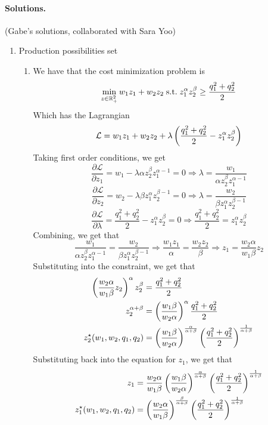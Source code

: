 \documentclass[12pt]{article}
\begin{document}
\paragraph{Solutions.} (Gabe's solutions, collaborated with Sara Yoo)

\begin{enumerate}
	\item Production possibilities set
	\begin{enumerate}
		\item We have that the cost minimization problem is
		\[
		\min_{z\in \mathbb{R}^2_+} w_1z_1 + w_2z_2 \;\text{s.t.}\; z_1^\alpha z_2^\beta \ge \frac{q_1^2 + q_2^2}{2}
		\]
		Which has the Lagrangian
		\[
		\mathcal{L} = w_1 z_1 + w_2 z_2 + \lambda \left(  \frac{q_1^2 + q_2^2}{2} -  z_1^\alpha z_2^\beta\right)
		\]
		Taking first order conditions, we get
		\[
		\frac{\partial \mathcal{L}}{\partial z_1} = w_1 - \lambda \alpha z_2^\beta z_1^{\alpha - 1} = 0 \Longrightarrow \lambda = \frac{w_1}{\alpha z_2^\beta z_1^{\alpha - 1}} 
		\]
		\[
		\frac{\partial \mathcal{L}}{\partial z_2} = w_2 - \lambda \beta z_1^\alpha z_2^{\beta - 1} = 0 \Longrightarrow \lambda = \frac{w_2}{\beta z_1^\alpha z_2^{\beta - 1}}
		\]
		\[
		\frac{\partial \mathcal{L}}{\partial \lambda} = \frac{q_1^2 + q_2^2}{2} -  z_1^\alpha z_2^\beta = 0 \Longrightarrow \frac{q_1^2 + q_2^2}{2} =  z_1^\alpha z_2^\beta
		\]
		Combining, we get that
		\[
		\frac{w_1}{\alpha z_2^\beta z_1^{\alpha - 1}} = \frac{w_2}{\beta z_1^\alpha z_2^{\beta - 1}} \Longrightarrow \frac{w_1 z_1}{\alpha} = \frac{w_2 z_2}{\beta} \Longrightarrow z_1 = \frac{w_2\alpha}{w_1\beta} z_2
		\]
		Substituting into the constraint, we get that
		\begin{align*}
			\left( \frac{w_2\alpha}{w_1\beta} z_2 \right)^\alpha z_2^\beta &= \frac{q_1^2 + q_2^2}{2} \\
			z_2^{\alpha + \beta} &= \left( \frac{w_1\beta}{w_2\alpha}\right)^{\alpha} \frac{q_1^2 + q_2^2}{2} \\
			z_2^\star(w_1,w_2,q_1,q_2) &= \left( \frac{w_1\beta}{w_2\alpha}\right)^{\frac{\alpha}{\alpha + \beta}} \left(\frac{q_1^2 + q_2^2}{2}\right)^{\frac{1}{\alpha + \beta}}
		\end{align*}
		Substituting back into the equation for $z_1$, we get that
		\begin{align*}
			z_1 &=  \frac{w_2\alpha}{w_1\beta} \parl \frac{w_1\beta}{w_2\alpha}\parr^{\frac{\alpha}{\alpha + \beta}} \parl\frac{q_1^2 + q_2^2}{2}\parr^{\frac{1}{\alpha + \beta}} \\
			z_1\opt(w_1,w_2,q_1,q_2) &= \parl \frac{w_2\alpha}{w_1\beta} \parr^{\frac{\beta}{\alpha + \beta}}\parl\frac{q_1^2 + q_2^2}{2}\parr^{\frac{1}{\alpha + \beta}}

\end{align*}
\end{enumerate}
\end{enumerate}
\end{document}
